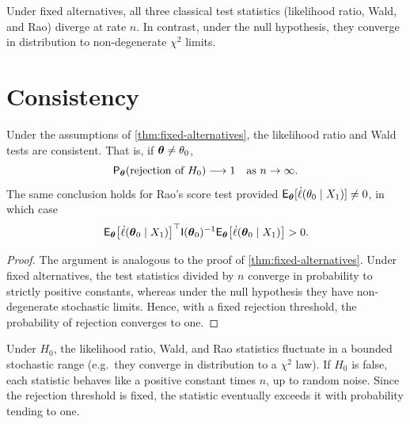 \begin{note}[Interpretation]\label{note:interpretation-fixed}
Under fixed alternatives, all three classical test statistics
(likelihood ratio, Wald, and Rao)
diverge at rate \(n\).
In contrast, under the null hypothesis, they converge in distribution to non-degenerate
\(\chi^2\) limits.
\end{note}

\section{Consistency}

\begin{corollary}\label{cor:consistency}
Under the assumptions of \autoref{thm:fixed-alternatives}, the likelihood ratio and Wald tests are consistent.
That is, if \(\boldsymbol{\theta} \neq \theta_0\),
\begin{equation*}\label{eq:consistency-lr-wald}
\mathsf{P}_{\boldsymbol{\theta}}(\text{rejection of } H_0) \longrightarrow 1
\quad \text{as } n \to \infty .
\end{equation*}
The same conclusion holds for Rao's score test provided
\(\mathsf{E}_{\boldsymbol{\theta}}[\dot{\ell}(\theta_0 \mid X_1)] \neq 0\), in which case
\begin{equation*}\label{eq:rao-positive}
\mathsf{E}_{\boldsymbol{\theta}}
\big[
\dot{\ell}(\boldsymbol{\theta}_0 \mid X_1)
\big]^{\top}
\mathsf{I}(\boldsymbol{\theta}_0)^{-1}
\mathsf{E}_{\boldsymbol{\theta}}
\big[
\dot{\ell}(\boldsymbol{\theta}_0 \mid X_1)
\big]
> 0 .
\end{equation*}
\end{corollary}

\begin{proof}
The argument is analogous to the proof of \autoref{thm:fixed-alternatives}.
Under fixed alternatives, the test statistics divided by \(n\) converge in probability to strictly positive constants,
whereas under the null hypothesis they have non-degenerate stochastic limits.
Hence, with a fixed rejection threshold, the probability of rejection converges to one.
\end{proof}

\begin{remark}\label{rem:why-consistent}
Under \(H_0\), the likelihood ratio, Wald, and Rao statistics fluctuate in a bounded stochastic range
(e.g.\ they converge in distribution to a \(\chi^2\) law).
If \(H_0\) is false, each statistic behaves like a positive constant times \(n\), up to random noise.
Since the rejection threshold is fixed, the statistic eventually exceeds it with probability tending to one.
\end{remark}

